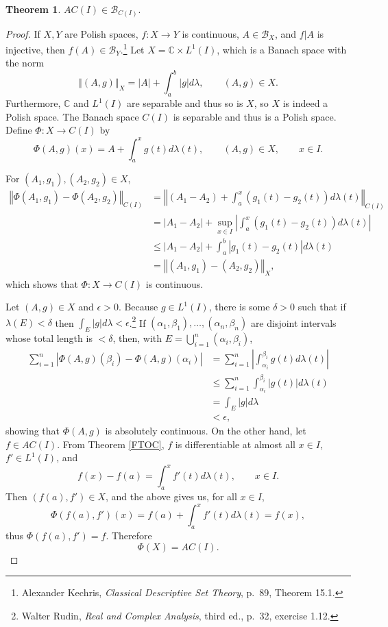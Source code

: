 \documentclass{article}
\newcommand{\norm}[1]{\left\Vert #1 \right\Vert}
\theoremstyle{definition}
\newtheorem{theorem}{Theorem}
\theoremstyle{definition}
\begin{document}
\begin{theorem}
$AC(I) \in \mathscr{B}_{C(I)}$.
\end{theorem}
\begin{proof}
If $X,Y$ are Polish spaces, $f:X \to Y$ is continuous, $A \in \mathscr{B}_X$, and $f|A$ is injective, then
$f(A) \in \mathscr{B}_Y$.\footnote{Alexander Kechris, {\em Classical Descriptive Set Theory}, p.~89, Theorem 15.1.}
Let $X=\mathbb{C} \times L^1(I)$,
which is a Banach space with the norm
\[
\norm{(A,g)}_X = |A|+\int_a^b |g| d\lambda, \qquad (A,g) \in X.
\]
Furthermore, $\mathbb{C}$ and $L^1(I)$ are separable and thus so is $X$, so $X$ is indeed a Polish space. The Banach space $C(I)$ is separable and thus is a Polish
space. 
Define $\Phi:X \to C(I)$ by
\[
\Phi(A,g)(x) = A + \int_a^x g(t) d\lambda(t), \qquad (A,g) \in X,  \qquad x \in I.
\]

For $(A_1,g_1),(A_2,g_2) \in X$,
\begin{align*}
\norm{\Phi(A_1,g_1)-\Phi(A_2,g_2)}_{C(I)} &= \norm{(A_1-A_2)+\int_a^x (g_1(t)-g_2(t)) d\lambda(t)}_{C(I)}\\
&=|A_1-A_2|+\sup_{x \in I} \left| \int_a^x (g_1(t)-g_2(t)) d\lambda(t)\right| \\
&\leq |A_1-A_2|+\int_a^b |g_1(t)-g_2(t)| d\lambda(t)\\
&=\norm{(A_1,g_1)-(A_2,g_2)}_X,
\end{align*}
which shows that $\Phi:X \to C(I)$ is continuous.

Let $(A,g) \in X$ and $\epsilon>0$. Because $g \in L^1(I)$, there is some
$\delta>0$ such that
if $\lambda(E)<\delta$ then $\int_E |g| d\lambda<\epsilon$.\footnote{Walter Rudin, {\em Real and Complex Analysis},
third ed., p.~32, exercise 1.12.}
If $(\alpha_1,\beta_1),\ldots,(\alpha_n,\beta_n)$ are disjoint intervals whose total length is $<\delta$,
then, with $E=\bigcup_{i=1}^n (\alpha_i,\beta_i)$,
\begin{align*}
\sum_{i=1}^n |\Phi(A,g)(\beta_i)-\Phi(A,g)(\alpha_i)| &= 
\sum_{i=1}^n \left| \int_{\alpha_i}^{\beta_i} g(t) d\lambda(t) \right|\\
&\leq \sum_{i=1}^n \int_{\alpha_i}^{\beta_i} |g(t)| d\lambda(t)\\
&=\int_E |g| d\lambda\\
&<\epsilon,
\end{align*}
showing that $\Phi(A,g)$ is absolutely continuous. 
On the other hand, let $f \in AC(I)$. From Theorem \ref{FTOC}, $f$ is differentiable at almost all $x \in I$,
$f' \in L^1(I)$, and  
\[
f(x)-f(a) = \int_a^x f'(t) d\lambda(t), \qquad x \in I.
\]
Then $(f(a),f') \in X$, and the above gives us, for all $x \in I$,
\[
\Phi(f(a),f')(x) =  f(a)+\int_a^x f'(t) d\lambda(t) = f(x),
\]
thus $\Phi(f(a),f')=f$. 
Therefore
\[
\Phi(X) = AC(I).
\]


\end{proof}
\end{document}
